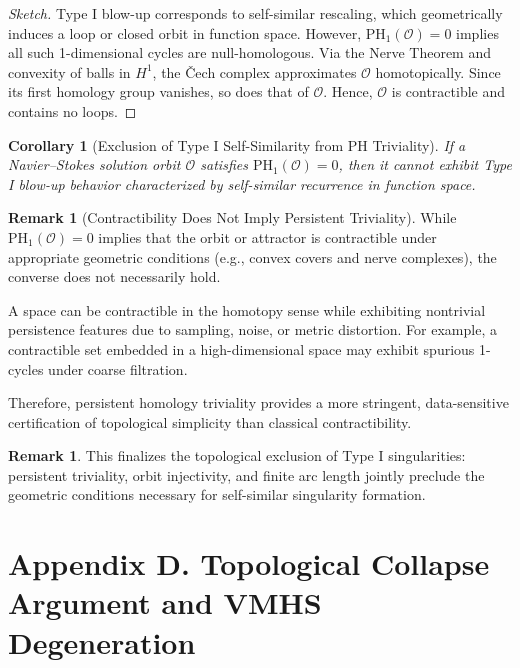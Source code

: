 \documentclass[11pt]{article}
\newtheorem{corollary}[theorem]{Corollary}
\theoremstyle{definition}
\newtheorem{remark}[theorem]{Remark}
\begin{document}
\begin{proof}[Sketch]
Type I blow-up corresponds to self-similar rescaling, which geometrically induces a loop or closed orbit in function space. However, \( \mathrm{PH}_1(\mathcal{O}) = 0 \) implies all such 1-dimensional cycles are null-homologous. Via the Nerve Theorem and convexity of balls in \( H^1 \), the Čech complex approximates \( \mathcal{O} \) homotopically. Since its first homology group vanishes, so does that of \( \mathcal{O} \). Hence, \( \mathcal{O} \) is contractible and contains no loops.
\end{proof}

\begin{corollary}[Exclusion of Type I Self-Similarity from PH Triviality]
If a Navier–Stokes solution orbit \( \mathcal{O} \) satisfies \( \mathrm{PH}_1(\mathcal{O}) = 0 \), then it cannot exhibit Type I blow-up behavior characterized by self-similar recurrence in function space.
\end{corollary}

\begin{remark}[Contractibility Does Not Imply Persistent Triviality]
While $\mathrm{PH}_1(\mathcal{O}) = 0$ implies that the orbit or attractor is contractible under appropriate geometric conditions (e.g., convex covers and nerve complexes), the converse does not necessarily hold.

A space can be contractible in the homotopy sense while exhibiting nontrivial persistence features due to sampling, noise, or metric distortion. For example, a contractible set embedded in a high-dimensional space may exhibit spurious 1-cycles under coarse filtration.

Therefore, persistent homology triviality provides a more stringent, data-sensitive certification of topological simplicity than classical contractibility.
\end{remark}


\begin{remark}
This finalizes the topological exclusion of Type I singularities: persistent triviality, orbit injectivity, and finite arc length jointly preclude the geometric conditions necessary for self-similar singularity formation.
\end{remark}


\section*{Appendix D. Topological Collapse Argument and VMHS Degeneration}
\end{document}
